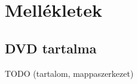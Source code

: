 \documentclass{elteikthesis}
\begin{document}
\begin{thebibliography}{99}
	\end{thebibliography}
	
	\chapter*{Mellékletek}


	\section*{DVD tartalma}
	TODO (tartalom, mappaszerkezet)
\end{document}
